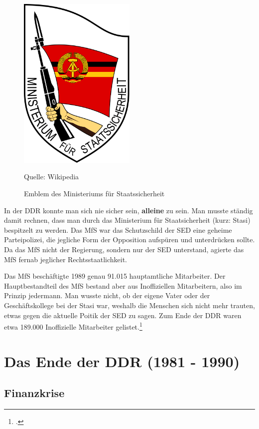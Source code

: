\documentclass[12pt,a4paper]{article}
\begin{document}
\begin{figure}[hh]
    \centering
    \includegraphics[width=0.5\textwidth]{Bilder/Emblem_Stasi.png}
    \caption{Emblem des Ministeriums für Staatssicherheit}
    Quelle: Wikipedia
    \label{img:stasi}
\end{figure}

In der DDR konnte man sich nie sicher sein, \textbf{alleine} zu sein. Man musste ständig damit rechnen, dass man durch das Ministerium für Staatsicherheit (kurz: Stasi) bespitzelt zu werden. Das MfS war das Schutzschild der SED eine geheime Parteipolizei, die jegliche Form der Opposition aufspüren und unterdrücken sollte.
Da das MfS nicht der Regierung, sondern nur der SED unterstand, agierte das MfS fernab jeglicher Rechtsstaatlichkeit.

Das MfS beschäftigte 1989 genau 91.015 hauptamtliche Mitarbeiter. Der Hauptbestandteil des MfS bestand aber aus Inoffiziellen Mitarbeitern, also im Prinzip jedermann. Man wusste nicht, ob der eigene Vater oder der Geschäftskollege bei der Stasi war, weshalb die Menschen sich nicht mehr trauten, etwas gegen die aktuelle Poitik der SED zu sagen.
Zum Ende der DDR waren etwa 189.000 Inoffizielle Mitarbeiter gelistet.\footcite{izpb:schein}


\newpage



\section{Das Ende der DDR (1981 - 1990)}
\label{sec:das-ende-der-ddr}

\subsection{Finanzkrise}
\label{finanzkrise}
\end{document}
